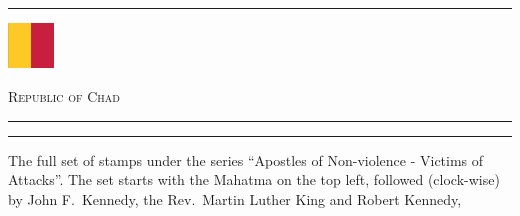 \documentclass[a4paper]{article}
\begin{document}
\hrule
\vspace{8pt}
\begin{minipage}{2cm}
  \includegraphics[height=1.2cm]{images/td}
\end{minipage}
\hfill
{\scshape\huge Republic of Chad}
\vspace{8pt}
\hrule
\vspace{17cm}
\begin{center}
\begin{minipage}{10cm}
  \hrule \vspace{12pt} The full set of stamps under the series
  ``Apostles of Non-violence - Victims of Attacks''. The set starts
  with the Mahatma on the top left, followed (clock-wise) by John
  F.\ Kennedy, the Rev.\ Martin Luther King and Robert Kennedy,
\end{minipage}
\end{center}
\end{document}
